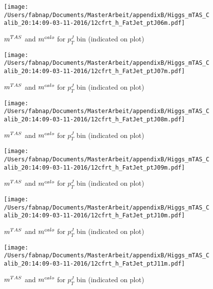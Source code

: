\begin{figure}
 
\texttt{[image: /Users/fabnap/Documents/MasterArbeit/appendixB/Higgs\_mTAS\_Calib\_20:14:09-03-11-2016/12cfrt\_h\_FatJet\_ptJ06m.pdf]}
\caption{$m^{TAS}$ and $m^{calo}$ for $p_{T}^{J}$ bin (indicated on plot) }
 
\end{figure}
\begin{figure}
 
\texttt{[image: /Users/fabnap/Documents/MasterArbeit/appendixB/Higgs\_mTAS\_Calib\_20:14:09-03-11-2016/12cfrt\_h\_FatJet\_ptJ07m.pdf]}
\caption{$m^{TAS}$ and $m^{calo}$ for $p_{T}^{J}$ bin (indicated on plot) }
 
\end{figure}
 
\begin{figure}
 
\texttt{[image: /Users/fabnap/Documents/MasterArbeit/appendixB/Higgs\_mTAS\_Calib\_20:14:09-03-11-2016/12cfrt\_h\_FatJet\_ptJ08m.pdf]}
\caption{$m^{TAS}$ and $m^{calo}$ for $p_{T}^{J}$ bin (indicated on plot) }
 
\end{figure}
 
\begin{figure}
 
\texttt{[image: /Users/fabnap/Documents/MasterArbeit/appendixB/Higgs\_mTAS\_Calib\_20:14:09-03-11-2016/12cfrt\_h\_FatJet\_ptJ09m.pdf]}
\caption{$m^{TAS}$ and $m^{calo}$ for $p_{T}^{J}$ bin (indicated on plot) }
 
\end{figure}
 
\begin{figure}
 
\texttt{[image: /Users/fabnap/Documents/MasterArbeit/appendixB/Higgs\_mTAS\_Calib\_20:14:09-03-11-2016/12cfrt\_h\_FatJet\_ptJ10m.pdf]}
\caption{$m^{TAS}$ and $m^{calo}$ for $p_{T}^{J}$ bin (indicated on plot) }
 
\end{figure}
 
\begin{figure}
 
\texttt{[image: /Users/fabnap/Documents/MasterArbeit/appendixB/Higgs\_mTAS\_Calib\_20:14:09-03-11-2016/12cfrt\_h\_FatJet\_ptJ11m.pdf]}
\caption{$m^{TAS}$ and $m^{calo}$ for $p_{T}^{J}$ bin (indicated on plot) }
 
\end{figure}
 
